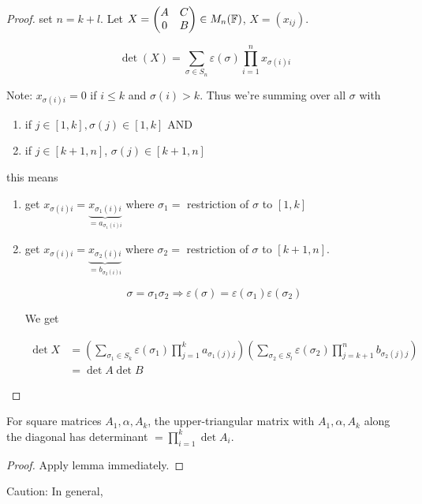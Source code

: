 \documentclass[a4paper]{article}
\begin{document}
\begin{proof}
	set $ n = k + l $. Let $ X = \begin{pmatrix}
	A & C\\
	0 & B
	\end{pmatrix} \in M_{n}(\mathbb{F}) $, $ X = (x_{ij}) $. 
	
	\[ \det(X) = \sum_{\sigma \in S_{n}} \varepsilon(\sigma) \prod_{i=1}^{n} x_{\sigma(i)i}  \]
	
	Note: $ x_{\sigma(i)i} = 0 $ if $ i \leq k $ and $ \sigma(i) > k $. Thus we're summing over all $ \sigma $ with 
	\begin{enumerate}
		\item if $ j \in [1,k], \sigma(j) \in [1,k] $ AND
		\item if $ j \in [k+1,n] $, $ \sigma(j) \in [k+1,n] $ 
 	\end{enumerate}
	this means
	\begin{enumerate}
		\item get $ x_{\sigma(i)i} = \underbrace{x_{\sigma_{1}(i)i}}_{=a_{\sigma_{1}(i)i}} $ where $ \sigma_{1} = $ restriction of $ \sigma $ to $ [1,k] $
		\item get $ x_{\sigma(i)i} = \underbrace{x_{\sigma_{2}(i)i}}_{=b_{\sigma_{2}(i)i}} $ where $ \sigma_{2} =  $ restriction of $ \sigma $ to $ [ k+1,n ] $. 
		
		
		\[ \sigma = \sigma_{1}\sigma_{2} \Rightarrow \varepsilon(\sigma) = \varepsilon(\sigma_{1})\varepsilon(\sigma_{2}) \]
		
		We get 
		
		\begin{align*}
		\det X & = \left(  \sum_{\sigma_{1} \in S_{k}} \varepsilon(\sigma_{1}) \prod_{j=1}^{k} a_{\sigma_{1}(j)j}  \right) \left(  \sum_{\sigma_{2} \in S_{l}} \varepsilon(\sigma_{2}) \prod_{j=k+1}^{n} b_{\sigma_{2}(j)j}  \right)   \\
		& = \det A \det B
		\end{align*}
	\end{enumerate}
\end{proof}

\begin{cor} 
	For square matrices $ A_{1},\alpha,A_{k} $, the upper-triangular matrix  with $ A_{1},\alpha,A_{k} $ along the diagonal has determinant $ = \prod_{i=1}^{k} \det A_{i} $. 
\end{cor}
\begin{proof}
	Apply lemma immediately.
\end{proof}

Caution: In general,
\end{document}
